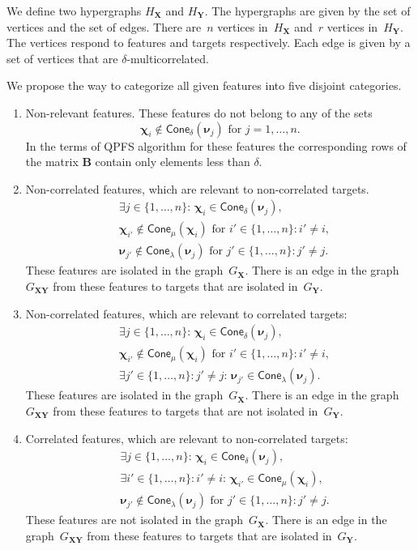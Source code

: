 \documentclass[12pt,twoside]{article}
\theoremstyle{definition}
\newcommand{\bY}{\mathbf{Y}}
\newcommand{\bX}{\mathbf{X}}
\newcommand{\bB}{\mathbf{B}}
\newcommand{\bchi}{\boldsymbol{\chi}}
\newcommand{\bnu}{\boldsymbol{\nu}}
\begin{document}
We define two hypergraphs $H_{\bX}$ and $H_{\bY}$. The hypergraphs are given by the set of vertices and the set of edges. There are~$n$ vertices in~$H_{\bX}$ and~$r$ vertices in~$H_{\bY}$. The vertices respond to features and targets respectively. Each edge is given by a set of vertices that are $\delta$-multicorrelated.  

We propose the way to categorize all given features into five disjoint categories. 
\begin{enumerate}
	\item Non-relevant features. These features do not belong to any of the sets
	\[
		\bchi_i \notin \textsf{Cone}_{\delta}(\bnu_j) \text{ for } j = 1, \dots, n.
	\]
	In the terms of QPFS algorithm for these features the corresponding rows of the matrix $\bB$ contain only elements less than $\delta$.
	\item Non-correlated features, which are relevant to non-correlated targets. 
	\begin{align*}
		&\exists j \in \{1, \dots, n\}: \, \bchi_i \in \textsf{Cone}_{\delta} (\bnu_j), \\
		&\bchi_{i'} \notin \textsf{Cone}_{\mu} (\bchi_i) \text{ for } i' \in \{1, \dots, n\}: i' \neq i,   \\
		&\bnu_{j'} \notin \textsf{Cone}_{\lambda} (\bnu_j) \text{ for } j' \in \{1, \dots, n\}: j' \neq j.
	\end{align*}
	These features are isolated in the graph~$G_{\bX}$. There is an edge in the graph~$G_{\bX\bY}$ from these features to targets that are isolated in~$G_{\bY}$. 

	\item Non-correlated features, which are relevant to correlated targets:
	\begin{align*}
	&\exists j \in \{1, \dots, n\}: \, \bchi_i \in \textsf{Cone}_{\delta} (\bnu_j), \\
	&\bchi_{i'} \notin \textsf{Cone}_{\mu} (\bchi_i) \text{ for } i' \in \{1, \dots, n\}: i' \neq i, \\
	&\exists j' \in \{1, \dots, n\}: j' \neq j: \,\bnu_{j'} \in \textsf{Cone}_{\lambda} (\bnu_j).
	\end{align*}
	These features are isolated in the graph~$G_{\bX}$. There is an edge in the graph~$G_{\bX\bY}$ from these features to targets that are not isolated in~$G_{\bY}$. 
	
	\item Correlated features, which are relevant to non-correlated targets:
	\begin{align*}
	&\exists j \in \{1, \dots, n\}: \, \bchi_i \in \textsf{Cone}_{\delta} (\bnu_j), \\
	&\exists i' \in \{1, \dots, n\}: i' \neq i: \,\bchi_{i'} \in \textsf{Cone}_{\mu} (\bchi_i),  \\
	&\bnu_{j'} \notin \textsf{Cone}_{\lambda} (\bnu_j) \text{ for } j' \in \{1, \dots, n\}: j' \neq j.
	\end{align*}
	These features are not isolated in the graph~$G_{\bX}$. There is an edge in the graph~$G_{\bX\bY}$ from these features to targets that are isolated in~$G_{\bY}$. 


\end{enumerate}
\end{document}
